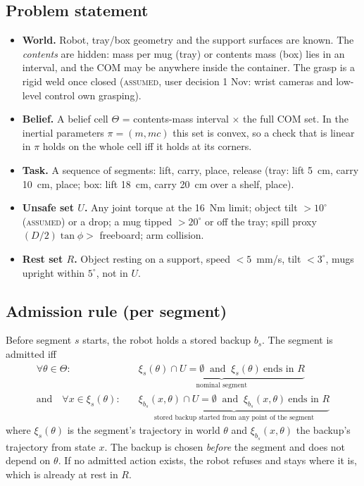 \documentclass[11pt,a4paper]{article}
\newcommand{\lab}[1]{\textsc{#1}}
\begin{document}
\subsection{Problem statement}
\begin{itemize}
\item \textbf{World.} Robot, tray/box geometry and the support surfaces are known. The \emph{contents} are hidden: mass per mug
(tray) or contents mass (box) lies in an interval, and the COM may be anywhere inside the container. The grasp is a rigid weld
once closed (\lab{assumed}, user decision 1 Nov: wrist cameras and low-level control own grasping).
\item \textbf{Belief.} A belief cell $\Theta$ = contents-mass interval $\times$ the full COM set. In the inertial parameters
$\pi=(m, m c)$ this set is convex, so a check that is linear in $\pi$ holds on the whole cell iff it holds at its corners.
\item \textbf{Task.} A sequence of segments: lift, carry, place, release (tray: lift 5~cm, carry 10~cm, place; box: lift 18~cm,
carry 20~cm over a shelf, place).
\item \textbf{Unsafe set $U$.} Any joint torque at the 16~Nm limit; object tilt $>10^\circ$ (\lab{assumed}) or a drop; a mug
tipped $>20^\circ$ or off the tray; spill proxy $(D/2)\tan\phi >$ freeboard; arm collision.
\item \textbf{Rest set $R$.} Object resting on a support, speed $<5$~mm/s, tilt $<3^\circ$, mugs upright within $5^\circ$, not in $U$.
\end{itemize}

\subsection{Admission rule (per segment)}
Before segment $s$ starts, the robot holds a stored backup $b_s$. The segment is admitted iff
\begin{align*}
\forall \theta\in\Theta:\quad & \underbrace{\xi_s(\theta)\cap U=\emptyset\ \text{ and }\ \xi_s(\theta)\ \text{ends in } R}_{\text{nominal segment}}\\
\text{and}\quad \forall x\in\xi_s(\theta):\quad & \underbrace{\xi_{b_s}(x,\theta)\cap U=\emptyset\ \text{ and }\ \xi_{b_s}(x,\theta)\ \text{ends in } R}_{\text{stored backup started from any point of the segment}}
\end{align*}
where $\xi_s(\theta)$ is the segment's trajectory in world $\theta$ and $\xi_{b_s}(x,\theta)$ the backup's trajectory from state $x$.
The backup is chosen \emph{before} the segment and does not depend on $\theta$. If no admitted action exists, the robot refuses
and stays where it is, which is already at rest in $R$.
\end{document}
